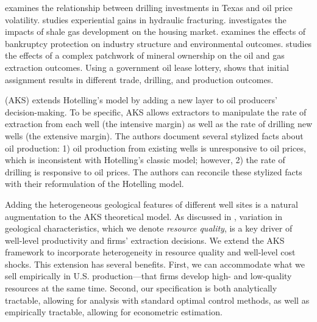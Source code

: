 {\cite{The-Effect-of-Uncertainty-on-Investment-Evidence-from-Texas-Oil-Drilling_Kellogg_2014} examines the relationship between drilling investments in Texas and oil price volatility. \cite{Experiential-Gains-with-a-New-Technology_2015_(Fitzgerald)} studies experiential gains in hydraulic fracturing. \cite{The-Housing-Market-Impacts-of-Shale-Gas-Development_Muehlenbach-Lucija-and-Timmins_2015}  investigates the impacts of shale gas development on the housing market. \cite{Drilling-Like-Theres-No-Tomorrow_Boomhower_2019} examines the effects of bankruptcy protection on industry structure and environmental outcomes. \cite{Patchwork-Policies-Spillovers-and-the-Search-for-Oil-and-Gas_Lewis_2019} studies the effects of a complex patchwork of mineral ownership on the oil and gas extraction outcomes. Using a government oil lease lottery, \cite{Information-Asymmetry-Trade-and-Drilling_Evidence-from-an-Oil-Lease-Lottery_Brehm-and-Lewis_2021} shows that initial assignment results in different trade, drilling, and production outcomes.} 

\cite{Hotelling-under-Pressure_AKS_2018} (AKS) extends Hotelling's model by adding a new layer to oil producers' decision-making. To be specific, AKS allows extractors to manipulate the rate of extraction from each well (the intensive margin) as well as the rate of drilling new wells (the extensive margin). The authors document several stylized facts about oil production: 1) oil production from existing wells is unresponsive to oil prices, which is inconsistent with Hotelling's classic model; however, 2) the rate of drilling is responsive to oil prices. The authors can reconcile these stylized facts with their reformulation of the Hotelling model. 

Adding the heterogeneous geological features of different well sites is a natural augmentation to the AKS theoretical model. As discussed in \cite{Learning-where-to-drill_Agerton_2020}, variation in geological characteristics, which we denote \textit{resource quality}, is a key driver of well-level productivity and firms' extraction decisions. We extend the AKS framework to incorporate heterogeneity in resource quality and well-level cost shocks. This extension has several benefits. First, we can accommodate what we sell empirically in U.S. production---that firms develop high- and low-quality resources at the same time. Second, our specification is both analytically tractable, allowing for analysis with standard optimal control methods, as well as empirically tractable, allowing for econometric estimation. 

